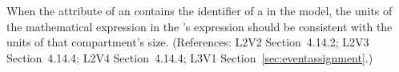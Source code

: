 When the  attribute of an \EventAssignment
contains the identifier of a \Compartment in the model, the
units of the mathematical expression in the
\EventAssignment's  expression should be
consistent with the units of that compartment's size.
(References: L2V2 Section~4.14.2; L2V3 Section~4.14.4; 
L2V4 Section~4.14.4; L3V1 Section~\ref{sec:eventassignment}.)
